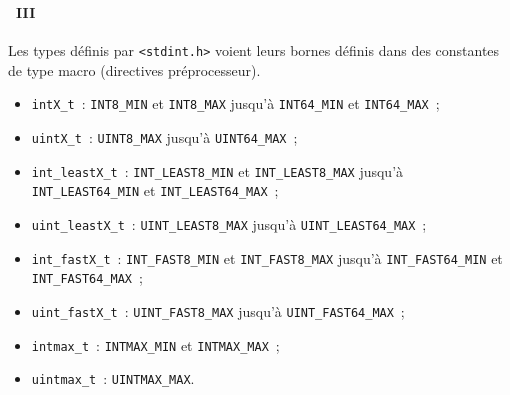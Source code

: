 \begin{frame}[containsverbatim]
  \frametitle{\secname}
  \framesubtitle{\subsecname~III} 

  Les types définis par \verb|<stdint.h>| voient leurs bornes définis dans des constantes de type macro (directives préprocesseur).
  \vspace{0.5cm}
  \begin{itemize}
    \item \verb|intX_t|~: \verb|INT8_MIN| et \verb|INT8_MAX| jusqu'à \verb|INT64_MIN| et \verb|INT64_MAX|~;
    \item \verb|uintX_t|~: \verb|UINT8_MAX| jusqu'à \verb|UINT64_MAX|~;
    \item \verb|int_leastX_t|~: \verb|INT_LEAST8_MIN| et \verb|INT_LEAST8_MAX| jusqu'à \verb|INT_LEAST64_MIN| et \verb|INT_LEAST64_MAX|~;
    \item \verb|uint_leastX_t|~: \verb|UINT_LEAST8_MAX| jusqu'à \verb|UINT_LEAST64_MAX|~;
    \item \verb|int_fastX_t|~: \verb|INT_FAST8_MIN| et \verb|INT_FAST8_MAX| jusqu'à \verb|INT_FAST64_MIN| et \verb|INT_FAST64_MAX|~;
    \item \verb|uint_fastX_t|~: \verb|UINT_FAST8_MAX| jusqu'à \verb|UINT_FAST64_MAX|~;    
    \item \verb|intmax_t|~: \verb|INTMAX_MIN| et \verb|INTMAX_MAX|~;
    \item \verb|uintmax_t|~: \verb|UINTMAX_MAX|.
  \end{itemize}
\end{frame}

